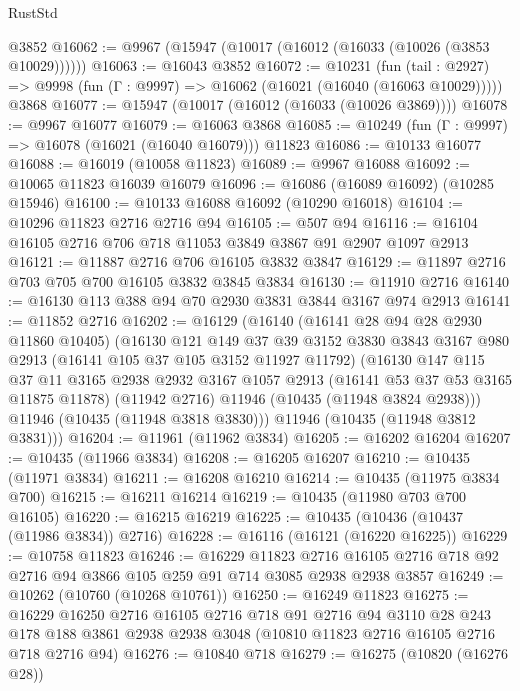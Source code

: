 \begin{lexlean}{RustStd}
\begin{coremodule}
    @3852
@16062 := @9967 (@15947 (@10017 (@16012 (@16033 (@10026 (@3853 @10029))))))
@16063 := @16043 @3852
@16072 := @10231
    (fun (tail : @2927) => @9998 (fun (Γ : @9997) => @16062 (@16021 (@16040 (@16063 @10029)))))
    @3868
@16077 := @15947 (@10017 (@16012 (@16033 (@10026 @3869))))
@16078 := @9967 @16077
@16079 := @16063 @3868
@16085 := @10249 (fun (Γ : @9997) => @16078 (@16021 (@16040 @16079))) @11823
@16086 := @10133 @16077
@16088 := @16019 (@10058 @11823)
@16089 := @9967 @16088
@16092 := @10065 @11823 @16039 @16079
@16096 := @16086 (@16089 @16092) (@10285 @15946)
@16100 := @10133 @16088 @16092 (@10290 @16018)
@16104 := @10296 @11823 @2716 @2716 @94
@16105 := @507 @94
@16116 := @16104 @16105 @2716 @706 @718 @11053 @3849 @3867 @91 @2907 @1097 @2913
@16121 := @11887 @2716 @706 @16105 @3832 @3847
@16129 := @11897 @2716 @703 @705 @700 @16105 @3832 @3845 @3834
@16130 := @11910 @2716
@16140 := @16130 @113 @388 @94 @70 @2930 @3831 @3844 @3167 @974 @2913
@16141 := @11852 @2716
@16202 := @16129
    (@16140
      (@16141 @28 @94 @28 @2930 @11860 @10405)
      (@16130
        @121
        @149
        @37
        @39
        @3152
        @3830
        @3843
        @3167
        @980
        @2913
        (@16141 @105 @37 @105 @3152 @11927 @11792)
        (@16130
          @147
          @115
          @37
          @11
          @3165
          @2938
          @2932
          @3167
          @1057
          @2913
          (@16141 @53 @37 @53 @3165 @11875 @11878)
          (@11942 @2716)
          @11946
          (@10435 (@11948 @3824 @2938)))
        @11946
        (@10435 (@11948 @3818 @3830)))
      @11946
      (@10435 (@11948 @3812 @3831)))
@16204 := @11961 (@11962 @3834)
@16205 := @16202 @16204
@16207 := @10435 (@11966 @3834)
@16208 := @16205 @16207
@16210 := @10435 (@11971 @3834)
@16211 := @16208 @16210
@16214 := @10435 (@11975 @3834 @700)
@16215 := @16211 @16214
@16219 := @10435 (@11980 @703 @700 @16105)
@16220 := @16215 @16219
@16225 := @10435 (@10436 (@10437 (@11986 @3834)) @2716)
@16228 := @16116 (@16121 (@16220 @16225))
@16229 := @10758 @11823
@16246 := @16229
    @11823
    @2716
    @16105
    @2716
    @718
    @92
    @2716
    @94
    @3866
    @105
    @259
    @91
    @714
    @3085
    @2938
    @2938
    @3857
@16249 := @10262 (@10760 (@10268 @10761))
@16250 := @16249 @11823
@16275 := @16229
    @16250
    @2716
    @16105
    @2716
    @718
    @91
    @2716
    @94
    @3110
    @28
    @243
    @178
    @188
    @3861
    @2938
    @2938
    @3048
    (@10810 @11823 @2716 @16105 @2716 @718 @2716 @94)
@16276 := @10840 @718
@16279 := @16275 (@10820 (@16276 @28))

\end{coremodule}
\end{lexlean}
